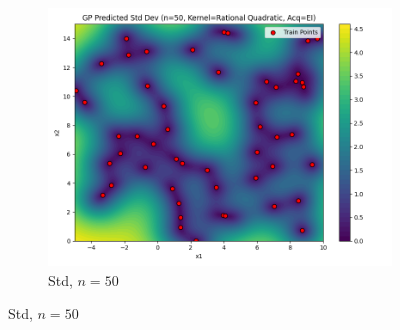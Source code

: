 \documentclass[a4paper,12pt]{article}
\begin{document}
\begin{figure}[H]
\begin{subfigure}{0.3\textwidth}
    \includegraphics[width=\linewidth]{Task-02/images/gp_std_rational_quadratic_n50_EI.png}
    \caption{Std, $n=50$}
\end{subfigure}


\end{figure}
\end{document}

